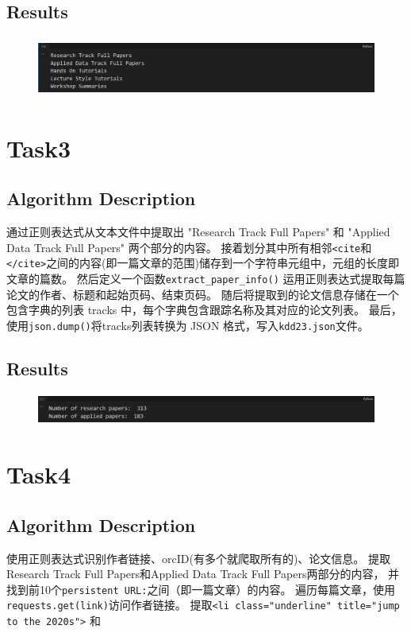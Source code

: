 \documentclass{ctexart}
\begin{document}
\subsection{Results}
\begin{figure}[H]
	\centering 
	\includegraphics[height=2cm,width=14cm]{2.png}
	\end{figure}
    \section{Task3}
    \subsection{Algorithm Description}
	通过正则表达式从文本文件中提取出 "Research Track Full Papers" 和 "Applied Data Track Full Papers" 两个部分的内容。
	接着划分其中所有相邻\verb|<cite|和\verb|</cite>|之间的内容(即一篇文章的范围)储存到一个字符串元组中，元组的长度即文章的篇数。
	然后定义一个函数\verb|extract_paper_info()| 运用正则表达式提取每篇论文的作者、标题和起始页码、结束页码。
	随后将提取到的论文信息存储在一个包含字典的列表 tracks 中，每个字典包含跟踪名称及其对应的论文列表。
	最后，使用\verb|json.dump()|将tracks列表转换为 JSON 格式，写入\verb|kdd23.json|文件。
	
\subsection{Results}
\begin{figure}[H]
	\centering 
	\includegraphics[height=1cm,width=14cm]{3.png}
	\end{figure}
    \section{Task4}

	\subsection{Algorithm Description}
	使用正则表达式识别作者链接、orcID(有多个就爬取所有的)、论文信息。
	提取Research Track Full Papers和Applied Data Track Full Papers两部分的内容，
	并找到前10个\verb|persistent URL:|之间（即一篇文章）的内容。
	遍历每篇文章，使用\verb|requests.get(link)|访问作者链接。
	提取\verb|<li class="underline" title="jump to the 2020s">| 和
	
\end{document}
